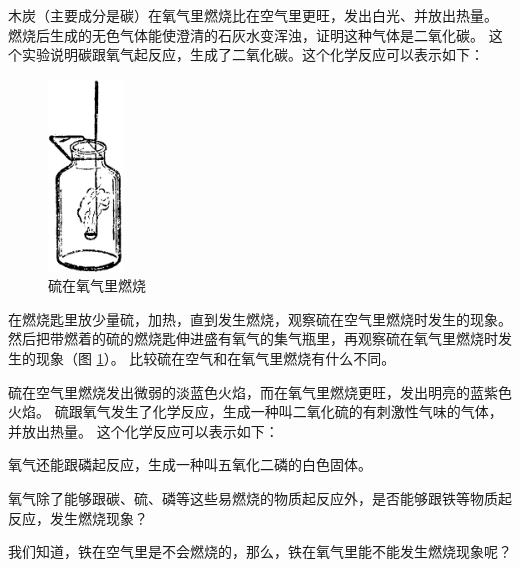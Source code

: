 木炭（主要成分是碳）在氧气里燃烧比在空气里更旺，发出白光、并放出热量。
燃烧后生成的无色气体能使澄清的石灰水变浑浊，证明这种气体是二氧化碳。
这个实验说明碳跟氧气起反应，生成了二氧化碳。这个化学反应可以表示如下：
\begin{fangchengshi}
\end{fangchengshi}


\begin{figure}
    \centering
    \includegraphics[width=2cm]{../pic/czhx1-ch1-4}
    \caption{硫在氧气里燃烧}\label{fig:1-4}
\end{figure}

\wrapfiguretrick

\begin{shiyan}
    在燃烧匙里放少量硫，加热，直到发生燃烧，观察硫在空气里燃烧时发生的现象。
    然后把带燃着的硫的燃烧匙伸进盛有氧气的集气瓶里，再观察硫在氧气里燃烧时发生的现象（图 \ref{fig:1-4}）。
    比较硫在空气和在氧气里燃烧有什么不同。
\end{shiyan}

硫在空气里燃烧发出微弱的淡蓝色火焰，而在氧气里燃烧更旺，发出明亮的蓝紫色火焰。
硫跟氧气发生了化学反应，生成一种叫二氧化硫的有刺激性气味的气体，并放出热量。
这个化学反应可以表示如下：

\vspace*{-1em}\begin{fangchengshi}
\end{fangchengshi}

氧气还能跟磷起反应，生成一种叫五氧化二磷的白色固体。
\begin{fangchengshi}
\end{fangchengshi}

氧气除了能够跟碳、硫、磷等这些易燃烧的物质起反应外，是否能够跟铁等物质起反应，发生燃烧现象？

我们知道，铁在空气里是不会燃烧的，那么，铁在氧气里能不能发生燃烧现象呢？

